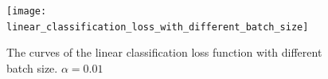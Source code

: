 \documentclass[journal, a4paper]{IEEEtran}
\begin{document}
\begin{figure}[!hbt]
    \begin{center}
    \texttt{[image: linear\_classification\_loss\_with\_different\_batch\_size]}
    \caption{The curves of the linear classification loss function with different batch size. $\alpha=0.01$}
    \label{fig:linear_classification_loss_with_different_batch_size}
    \end{center}
\end{figure}













\end{document}
